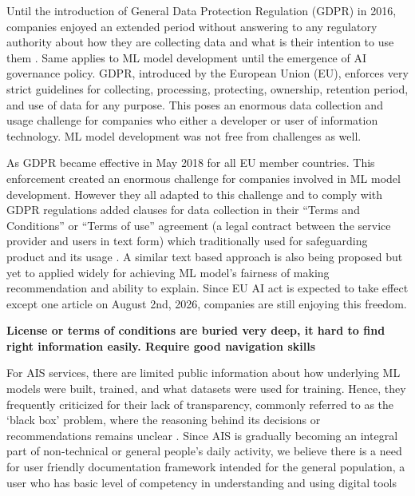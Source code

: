 \documentclass[manuscript,screen,review]{acmart}
\begin{document}
	Until the introduction of General Data Protection Regulation (GDPR) in 2016, companies enjoyed an extended period without answering to any regulatory authority about how they are collecting data and what is their intention to use them \cite{GDPR2016a}. Same applies to ML model development until the emergence of AI governance policy. GDPR, introduced by the European Union (EU), enforces very strict guidelines for collecting, processing, protecting, ownership, retention period, and use of data for any purpose. This poses an enormous data collection and usage challenge for companies who either a developer or user of information technology. ML model development was not free from challenges as well. 
	
	As GDPR became effective in May 2018 for all EU member countries. This enforcement created an enormous challenge for companies involved in ML model development. However they all adapted to this challenge and to comply with GDPR regulations added clauses for data collection in their \enquote{Terms and Conditions} or \enquote{Terms of use} agreement (a legal contract between the service provider and users in text form) which traditionally used for safeguarding product and its usage \cite{buttarelli_we_2019}. A similar text based approach is also being proposed but yet to applied widely for achieving ML model's fairness of making recommendation and ability to explain. Since EU AI act is expected to take effect except one article on August 2nd, 2026, companies are still enjoying this freedom. 
	
	\textbf{License or terms of conditions are buried very deep, it hard to find right information easily. Require good navigation skills}
	
	For AIS services, there are limited public information about how underlying ML models were built, trained, and what datasets were used for training. Hence, they frequently criticized for their lack of transparency, commonly referred to as the ‘black box’ problem, where the reasoning behind its decisions or recommendations remains unclear \cite{app15020672} \cite{10.2478} \cite{JSSv036i11}. Since AIS is gradually becoming an integral part of non-technical or general people's daily activity, we believe there is a need for user friendly documentation framework intended for the general population, a user who has basic level of competency in understanding and using digital tools \cite{literacy}
	
	
\end{document}
